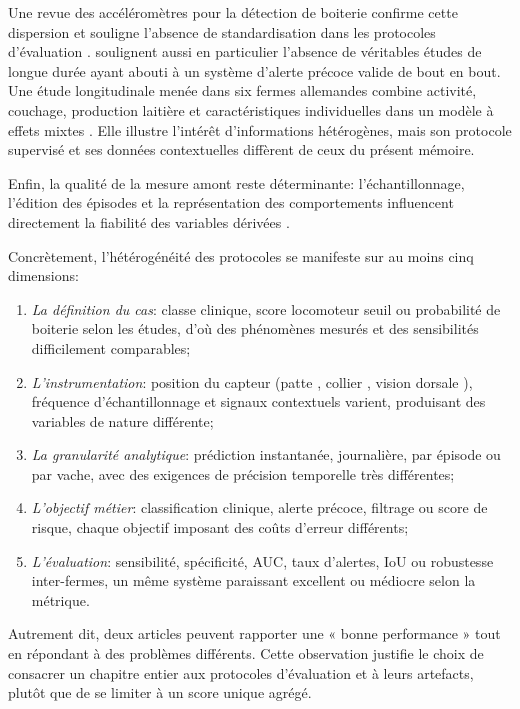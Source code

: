 Une revue des accéléromètres pour la détection de boiterie confirme cette dispersion et
souligne l'absence de standardisation dans les protocoles d'évaluation
\citep{oleary2020accelerometers}.
\citet{alsaaod2019automatic} soulignent aussi en particulier l'absence
de véritables études de longue durée ayant abouti à un système d'alerte précoce valide de
bout en bout.
Une étude longitudinale menée dans six fermes allemandes combine activité, couchage,
production laitière et caractéristiques individuelles dans un modèle à effets mixtes
\citep{lavrova2023lameness}. Elle illustre l'intérêt d'informations hétérogènes, mais son
protocole supervisé et ses données contextuelles diffèrent de ceux du présent mémoire.

Enfin, la qualité de la mesure amont reste déterminante: l'échantillonnage, l'édition des
épisodes et la représentation des comportements influencent directement la fiabilité des
variables dérivées \citep{ledgerwood2010lying,balasso2023behaviour}.

Concrètement, l'hétérogénéité des protocoles se manifeste sur au moins cinq dimensions:
\begin{enumerate}
    \item \textit{La définition du cas}: classe clinique, score locomoteur seuil ou probabilité
    de boiterie selon les études, d'où des phénomènes mesurés et des sensibilités
    difficilement comparables;
    \item \textit{L'instrumentation}: position du capteur (patte
    \citep{alsaaod2012electronic,thorup2015lameness}, collier
    \citep{vanhertem2013lameness}, vision dorsale \citep{viazzi2013analysis}), fréquence
    d'échantillonnage et signaux
    contextuels varient, produisant des variables de nature différente;
    \item \textit{La granularité analytique}: prédiction instantanée, journalière, par épisode
    ou par vache, avec des exigences de précision temporelle très différentes;
    \item \textit{L'objectif métier}: classification clinique, alerte précoce, filtrage ou
    score de risque, chaque objectif imposant des coûts d'erreur différents;
    \item \textit{L'évaluation}: sensibilité, spécificité, AUC, taux d'alertes, IoU ou
    robustesse inter-fermes, un même système paraissant excellent ou médiocre selon la
    métrique.
\end{enumerate}

Autrement dit, deux articles peuvent rapporter une « bonne performance » tout en répondant à
des problèmes différents. Cette observation justifie le choix de consacrer un chapitre entier
aux protocoles d'évaluation et à leurs artefacts, plutôt que de se limiter à un score unique
agrégé.

